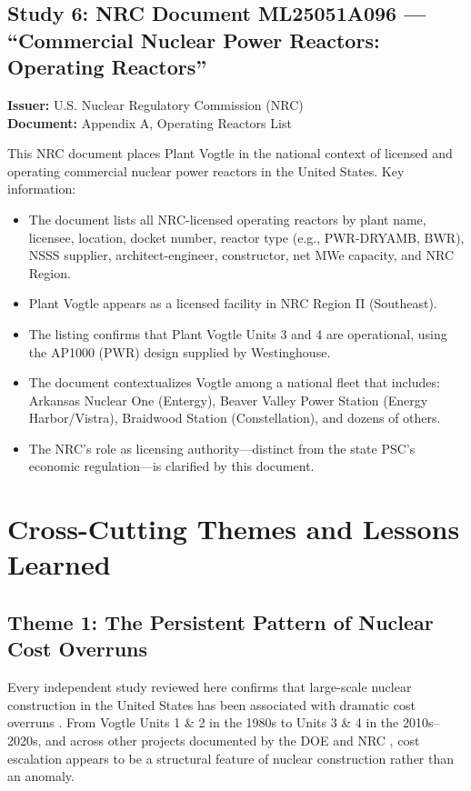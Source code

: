 \documentclass[12pt,a4paper]{article}
\begin{document}
\subsection{Study 6: NRC Document ML25051A096 --- ``Commercial Nuclear Power Reactors: Operating Reactors''}

\textbf{Issuer:} U.S. Nuclear Regulatory Commission (NRC)\\
\textbf{Document:} Appendix A, Operating Reactors List

This NRC document places Plant Vogtle in the national context of licensed and
operating commercial nuclear power reactors in the United States. Key information:

\begin{itemize}
    \item The document lists all NRC-licensed operating reactors by plant name,
          licensee, location, docket number, reactor type (e.g., PWR-DRYAMB, BWR),
          NSSS supplier, architect-engineer, constructor, net MWe capacity, and NRC Region.
    \item Plant Vogtle appears as a licensed facility in NRC Region II (Southeast).
    \item The listing confirms that Plant Vogtle Units 3 and 4 are operational, using
          the AP1000 (PWR) design supplied by Westinghouse.
    \item The document contextualizes Vogtle among a national fleet that includes:
          Arkansas Nuclear One (Entergy), Beaver Valley Power Station (Energy Harbor/Vistra),
          Braidwood Station (Constellation), and dozens of others.
    \item The NRC's role as licensing authority---distinct from the state PSC's economic
          regulation---is clarified by this document.
\end{itemize}

\section{Cross-Cutting Themes and Lessons Learned}

\subsection{Theme 1: The Persistent Pattern of Nuclear Cost Overruns}

Every independent study reviewed here confirms that large-scale nuclear construction
in the United States has been associated with dramatic cost overruns \cite{schlissel_ieefa,gcv_ratepayer,durand_truth}. From Vogtle
Units 1 \& 2 in the 1980s to Units 3 \& 4 in the 2010s--2020s, and across other
projects documented by the DOE and NRC \cite{doe_eia0485}, cost escalation appears to be a structural
feature of nuclear construction rather than an anomaly.
\end{document}
